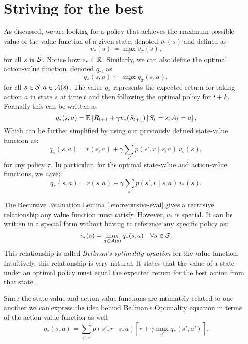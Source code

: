 \section{Striving for the best}

As discussed, we are looking for a policy that achieves the maximum possible value
of the value function of a given state, denoted $v_*(s)$ and defined as
\[
	v_* (s) \coloneqq \max_{\pi} v_\pi (s),
\]
for all $s$ in $\mathcal{S}$. Notice how $v_* \in \mathbb{R}$. Similarly, we can also
define the optimal action-value function, denoted $q_*$, as
\[
	q_* (s, a) \coloneqq \max_{\pi} q_\pi (s, a),
\]
for all $s \in \mathcal{S}, a \in \mathcal{A}(s)$. The value $q_*$ represents the
expected return for taking action $a$ in state $s$ at time $t$ and then
following the optimal policy for $t+k$. Formally this can be written as
\[
	q_{*} (s, a) = \mathbb{E} \left[ R_{t+1} + \gamma v_* (S_{t+1}) \,\middle\vert\, S_t = s, A_t = a \right],
\]
Which can be further simplified by using our previously defined state-value function as:
\begin{equation}
	\label{eq:q-by-v}
	q_\pi (s, a) = r(s, a) + \gamma \sum_{s'} p(s', r \mid s, a) \, v_\pi (s),
\end{equation}
for any policy $\pi$. In particular, for the optimal state-value and action-value functions, we have:
\begin{equation}
	q_*	(s, a) = r(s, a) + \gamma \sum_{s'} p(s', r \mid s, a) \, v_* (s).
\end{equation}

The Recursive Evaluation Lemma \ref{lem:recursive-eval} gives a recursive
relationship any value function must satisfy. However, $v_*$ is special. It can
be written in a special form \cite{bellman1957,SuttonBarto,raoRL4F} without
having to reference any specific policy as:
\begin{equation}
	\label{eq:prop-dependencia-vq}
	v_* (s) = \max_{a \in \mathcal{A}(s)} q_* (s, a) \quad \forall s \in \mathcal{S}.
\end{equation}
This relationship is called \textit{Bellman's optimality equation} for the value
function. Intuitively, this relationship is very natural. It states that the
value of a state under an optimal policy must equal the expected return for the
best action from that state \cite[Ch.~3.6]{SuttonBarto}.

Since the state-value and action-value functions are intimately related to one
another we can express the idea behind Bellman's Optimality equation in terms of
the action-value function as well
\[
	q_* (s, a) = \sum_{s', r} p(s', r \mid s, a) \left[ r + \gamma \max_{a'} q_{*} (s', a') \right].
\]

